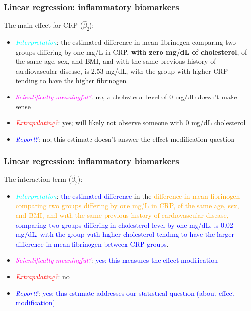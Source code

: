 \documentclass[12pt, 
hyperref={colorlinks=true, linkcolor=blue, urlcolor=cyan},dvipsnames]{beamer}
\begin{document}
\begin{frame}
\frametitle{Linear regression: inflammatory biomarkers}
The main effect for CRP ($\hat{\beta}_2$): \vspace{-0.3cm}
\begin{itemize}
\item \textcolor{cyan}{\textit{Interpretation}}: the estimated difference in mean fibrinogen comparing two groups differing by one mg/L in CRP, \textbf{with zero mg/dL of cholesterol}, of the same age, sex, and BMI, and with the same previous history of cardiovascular disease, is 2.53 mg/dL, with the group with higher CRP tending to have the higher fibrinogen.
\item \textcolor{magenta}{\textit{Scientifically meaningful?}}: no; a cholesterol level of 0 mg/dL doesn't make sense
\item \textcolor{red}{\textit{Extrapolating?}}: yes; will likely not observe someone with 0 mg/dL cholesterol
\item \textcolor{blue}{\textit{Report?}}: no; this estimate doesn't answer the effect modification question
\end{itemize}
\end{frame}

\begin{frame}
\frametitle{Linear regression: inflammatory biomarkers}
The interaction term ($\hat{\beta}_7$): \vspace{-0.3cm}
\begin{itemize}
\item \textcolor{cyan}{\textit{Interpretation}}: \textcolor{blue}{the estimated difference} in the \textcolor{orange}{difference in mean fibrinogen comparing two groups differing by one mg/L in CRP, of the same age, sex, and BMI, and with the same previous history of cardiovascular disease,} \textcolor{blue}{comparing two groups differing in cholesterol level by one mg/dL, is 0.02 mg/dL, with the group with higher cholesterol tending to have the larger difference in mean fibrinogen between CRP groups}.
\item \textcolor{magenta}{\textit{Scientifically meaningful?}}: \textcolor{blue}{yes; this measures the effect modification}
\item \textcolor{red}{\textit{Extrapolating?}}: no
\item \textcolor{blue}{\textit{Report?}}: \textcolor{blue}{yes; this estimate addresses our statistical question (about effect modification)}
\end{itemize}
\end{frame}
\end{document}
